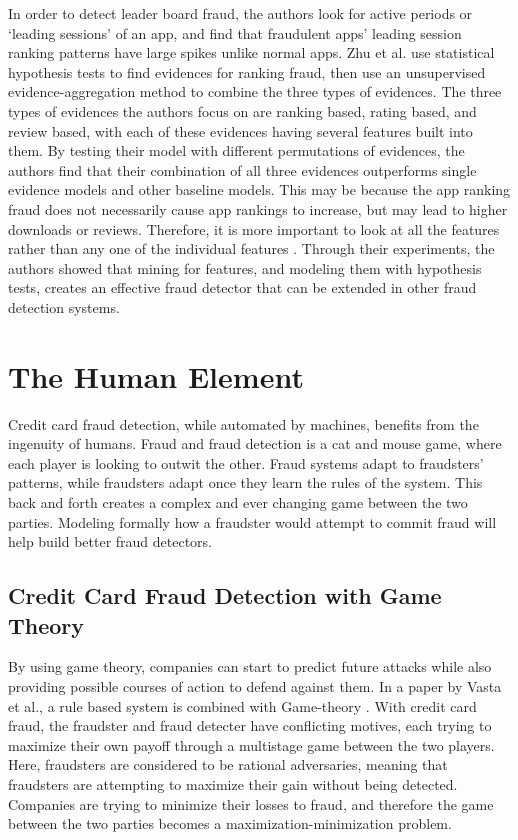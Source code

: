 \documentclass[midd]{thesis}
\begin{document}
In order to detect leader board fraud, the authors look for active periods or `leading sessions' of an app, and find that fraudulent apps' leading session ranking patterns have large spikes unlike normal apps. Zhu et al. use statistical hypothesis tests to find evidences for ranking fraud, then use an unsupervised evidence-aggregation method to combine the three types of evidences. The three types of evidences the authors focus on are ranking based, rating based, and review based, with each of these evidences having several features built into them. By testing their model with different permutations of evidences, the authors find that their combination of all three evidences outperforms single evidence models and other baseline models. This may be because the app ranking fraud does not necessarily cause app rankings to increase, but may lead to higher downloads or reviews. Therefore, it is more important to look at all the features rather than any one of the individual features \cite{Zhu2015}. Through their experiments, the authors showed that mining for features, and modeling them with hypothesis tests, creates an effective fraud detector that can be extended in other fraud detection systems. 


\section{The Human Element}

Credit card fraud detection, while automated by machines, benefits from the ingenuity of humans. Fraud and fraud detection is a cat and mouse game, where each player is looking to outwit the other. Fraud systems adapt to fraudsters' patterns, while fraudsters adapt once they learn the rules of the system. This back and forth creates a complex and ever changing game between the two parties. Modeling formally how a fraudster would attempt to commit fraud will help build better fraud detectors.

\subsection{Credit Card Fraud Detection with Game Theory}

 
By using game theory, companies can start to predict future attacks while also providing possible courses of action to defend against them. In a paper by Vasta et al., a rule based system is combined with Game-theory \cite{Vatsa2007}. With credit card fraud, the fraudster and fraud detecter have conflicting motives, each trying to maximize their own payoff through a multistage game between the two players. Here, fraudsters are considered to be rational adversaries, meaning that fraudsters are attempting to maximize their gain without being detected. Companies are trying to minimize their losses to fraud, and therefore the game between the two parties becomes a maximization-minimization problem. 
 
\end{document}
